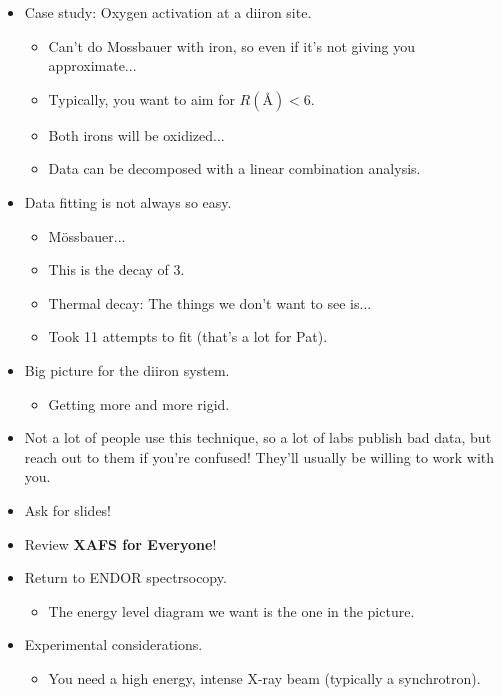 \documentclass[../notes.tex]{subfiles}
\begin{document}
\begin{itemize}
\begin{enumerate}
\begin{itemize}
        \end{itemize}
    \end{enumerate}
    \item Case study: Oxygen activation at a diiron site.
    \begin{itemize}
        \item Can't do Mossbauer with iron, so even if it's not giving you approximate...
        \item Typically, you want to aim for $R(\si{\angstrom})<6$.
        \item Both irons will be oxidized...
        \item Data can be decomposed with a linear combination analysis.
    \end{itemize}
    \item Data fitting is not always so easy.
    \begin{itemize}
        \item M\"{o}ssbauer...
        \item This is the decay of 3.
        \item Thermal decay: The things we don't want to see is...
        \item Took 11 attempts to fit (that's a lot for Pat). 
    \end{itemize}
    \item Big picture for the diiron system.
    \begin{itemize}
        \item Getting more and more rigid.
    \end{itemize}
    \item Not a lot of people use this technique, so a lot of labs publish bad data, but reach out to them if you're confused! They'll usually be willing to work with you.
    \item Ask for slides!
    \item Review \textbf{XAFS for Everyone}!
    \item Return to ENDOR spectrsocopy.
    \begin{itemize}
        \item The energy level diagram we want is the one in the picture.
    \end{itemize}
    \item Experimental considerations.
    \begin{itemize}
        \item You need a high energy, intense X-ray beam (typically a synchrotron).
        \begin{itemize}

\end{itemize}
\end{itemize}
\end{itemize}
\end{document}
